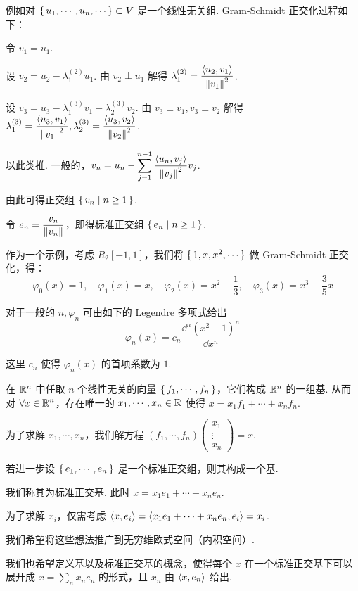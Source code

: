 例如对 $\set{u_1,\cdots,u_n,\cdots}\subset V$ 是一个线性无关组. Gram-Schmidt 正交化过程如下：

令 $v_1=u_1$.

设 $v_2=u_2-\lambda_1^{(2)}u_1$. 由 $v_2\perp u_1$ 解得 $\lambda_1^{(2)}=\dfrac{\left\langle{u_2,v_1}\right\rangle}{\left\lVert{v_1}\right\rVert^2}$.

设 $v_3=u_3-\lambda_1^{(3)}v_1-\lambda_2^{(3)}v_2$. 由 $v_3\perp v_1,v_3\perp v_2$ 解得 $\lambda_1^{(3)}=\dfrac{\left\langle{u_3,v_1}\right\rangle}{\left\lVert{v_1}\right\rVert^2},\lambda_2^{(3)}=\dfrac{\left\langle{u_3,v_2}\right\rangle}{\left\lVert{v_2}\right\rVert^2}$.

以此类推. 一般的，$v_n=u_n-\displaystyle\sum_{j=1}^{n-1}\frac{\left\langle{u_n,v_j}\right\rangle}{\left\lVert{v_j}\right\rVert^2}v_j$.

由此可得正交组 $\set{v_n|n\ge 1}$.

令 $e_n=\dfrac{v_n}{\left\lVert{v_n}\right\rVert}$，即得标准正交组 $\set{e_n|n\ge 1}$.

作为一个示例，考虑 $R_2[-1,1]$，我们将 $\set{1,x,x^2,\cdots}$ 做 Gram-Schmidt 正交化，得：
$$
\varphi_0(x)=1,\quad\varphi_1(x)=x,\quad\varphi_2(x)=x^2-\frac{1}{3},\quad\varphi_3(x)=x^3-\frac{3}{5}x
$$

对于一般的 $n,\varphi_n$ 可由如下的 Legendre 多项式给出
$$
\varphi_n(x)=c_n\frac{\dd^n(x^2-1)^n}{\dd x^n}
$$

这里 $c_n$ 使得 $\varphi_n(x)$ 的首项系数为 $1$.


在 $\mathbb{R}^n$ 中任取 $n$ 个线性无关的向量 $\set{f_1,\cdots,f_n}$，它们构成 $\mathbb{R}^n$ 的一组基. 从而对 $\forall x\in\mathbb{R}^n$，存在唯一的 $x_1,\cdots,x_n\in\mathbb{R}$ 使得 $x=x_1f_1+\cdots+x_nf_n$.

为了求解 $x_1,\cdots,x_n$，我们解方程 $(f_1,\cdots,f_n)\begin{pmatrix}x_1\\\vdots\\x_n\end{pmatrix}=x$.

若进一步设 $\set{e_1,\cdots,e_n}$ 是一个标准正交组，则其构成一个基.

我们称其为标准正交基. 此时 $x=x_1e_1+\cdots+x_ne_n$.

为了求解 $x_i$，仅需考虑 $\left\langle{x,e_i}\right\rangle=\left\langle{x_1e_1+\cdots+x_ne_n,e_i}\right\rangle=x_i$.

我们希望将这些想法推广到无穷维欧式空间（内积空间）.

我们也希望定义基以及标准正交基的概念，使得每个 $x$ 在一个标准正交基下可以展开成 $x=\sum\limits_nx_ne_n$ 的形式，且 $x_n$ 由 $\left\langle{x,e_n}\right\rangle$ 给出.

